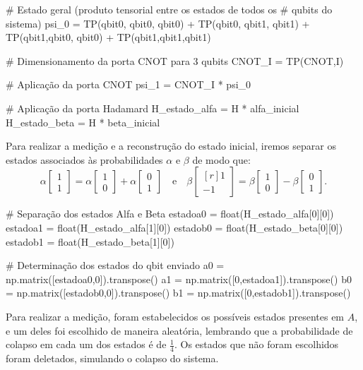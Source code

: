\begin{pycode}
    # Estado geral (produto tensorial entre os estados de todos os
    # qubits do sistema)
    psi_0 = TP(qbit0, qbit0, qbit0) + TP(qbit0, qbit1, qbit1) +
            TP(qbit1,qbit0, qbit0) + TP(qbit1,qbit1,qbit1)

    # Dimensionamento da porta CNOT para 3 qubits
    CNOT_I = TP(CNOT,I)

    # Aplicação da porta CNOT
    psi_1 = CNOT_I * psi_0

    # Aplicação da porta Hadamard
    H_estado_alfa = H * alfa_inicial
    H_estado_beta = H * beta_inicial
\end{pycode}

Para realizar a medição e a reconstrução do estado inicial, iremos separar os estados associados às probabilidades \(\alpha\) e \(\beta\) de modo que:
\[
  \alpha \begin{bmatrix} 1 \\ 1 \end{bmatrix} = \alpha \begin{bmatrix} 1 \\ 0 \end{bmatrix} + \alpha \begin{bmatrix} 0 \\ 1 \end{bmatrix}
  \quad \text{e} \quad
  \beta \begin{bmatrix*}[r] 1 \\ -1 \end{bmatrix*} = \beta \begin{bmatrix} 1 \\ 0 \end{bmatrix} - \beta \begin{bmatrix} 0 \\ 1 \end{bmatrix}.
\]

\begin{pycode}
    # Separação dos estados Alfa e Beta
    estadoa0 = float(H_estado_alfa[0][0])
    estadoa1 = float(H_estado_alfa[1][0])
    estadob0 = float(H_estado_beta[0][0])
    estadob1 = float(H_estado_beta[1][0])

    # Determinação dos estados do qbit enviado
    a0 = np.matrix([estadoa0,0]).transpose()
    a1 = np.matrix([0,estadoa1]).transpose()
    b0 = np.matrix([estadob0,0]).transpose()
    b1 = np.matrix([0,estadob1]).transpose()
\end{pycode}

Para realizar a medição, foram estabelecidos os possíveis estados presentes em \(A\), e um deles foi escolhido de maneira aleatória, lembrando que a probabilidade de colapso em cada um dos estados é de \(\frac{1}{4}\). Os estados que não foram escolhidos foram deletados, simulando o colapso do sistema.

